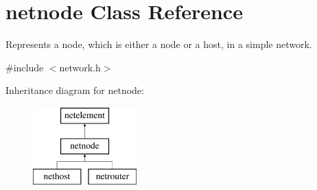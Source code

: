 \hypertarget{classnetnode}{\section{netnode Class Reference}
\label{classnetnode}
}


Represents a node, which is either a node or a host, in a simple network.  




{\ttfamily \#include $<$network.\-h$>$}

Inheritance diagram for netnode\-:\begin{figure}[H]
\begin{center}
\leavevmode
\includegraphics[height=3.000000cm]{classnetnode}
\end{center}
\end{figure}
